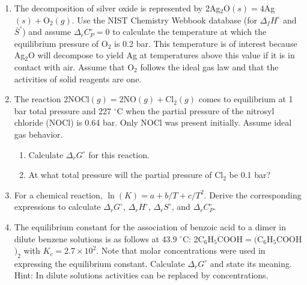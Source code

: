 \begin{enumerate}

\item The decomposition of silver oxide is represented by 2Ag$_2$O$(s) = 4$Ag$(s) + $O$_2(g)$. Use the NIST Chemistry Webbook database (for $\Delta_fH^\circ$ and $\bar{S}^\circ$) and assume $\Delta_rC_P^\circ = 0$ to calculate the temperature at which the equilibrium pressure of O$_2$ is 0.2 bar. This temperature is of interest because Ag$_2$O will decompose to yield Ag at temperatures above this value if it is in contact with air. Assume that O$_2$ follows the ideal gas law and that the activities of solid reagents are one.


\item The reaction 2NOCl$(g) = 2$NO$(g) + $Cl$_2(g)$ comes to equilibrium at 1 bar total pressure and 227 $^\circ$C when the partial pressure of the nitrosyl chloride (NOCl) is 0.64 bar. Only NOCl was present initially. Assume ideal gas behavior.

\begin{enumerate}
\item Calculate $\Delta_rG^\circ$ for this reaction.
\item At what total pressure will the partial pressure of Cl$_2$ be 0.1 bar?
\end{enumerate}


\item For a chemical reaction, $\ln(K) = a + b / T + c / T^2$. Derive the corresponding expressions to calculate $\Delta_rG^\circ$, $\Delta_rH^\circ$, $\Delta_rS^\circ$, and $\Delta_rC_P^\circ$.


\item The equilibrium constant for the association of benzoic acid to a dimer in dilute benzene solutions is as follows at 43.9 $^\circ$C: 2C$_6$H$_5$COOH$ = ($C$_6$H$_5$COOH$)_2$ with $K_c = 2.7 \times 10^2$. Note that molar concentrations were used in expressing the equilibrium constant. Calculate $\Delta_rG^\circ$ and state its meaning. Hint: In dilute solutions activities can be replaced by concentrations.


\end{enumerate}
